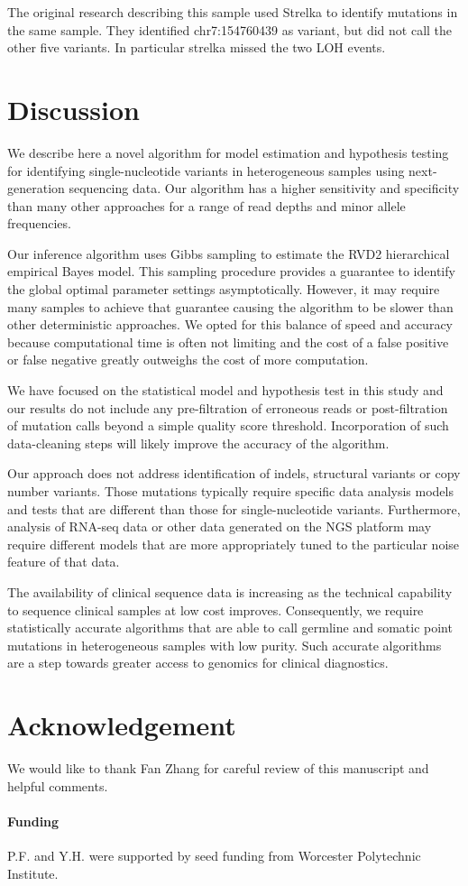 \documentclass{bioinfo}
\begin{document}
The original research describing this sample used Strelka to identify mutations in the same sample. They identified chr7:154760439 as variant, but did not call the other five variants. In particular strelka missed the two LOH events.  %

\section{Discussion}
We describe here a novel algorithm for model estimation and hypothesis testing for identifying single-nucleotide variants in heterogeneous samples using next-generation sequencing data. Our algorithm has a higher sensitivity and specificity than many other approaches for a range of read depths and minor allele frequencies.

Our inference algorithm uses Gibbs sampling to estimate the RVD2 hierarchical empirical Bayes model. This sampling procedure provides a guarantee to identify the global optimal parameter settings asymptotically. However, it may require many samples to achieve that guarantee causing the algorithm to be slower than other deterministic approaches. We opted for this balance of speed and accuracy because computational time is often not limiting and the cost of a false positive or false negative greatly outweighs the cost of more computation.

We have focused on the statistical model and hypothesis test in this study and our results do not include any pre-filtration of erroneous reads or post-filtration of mutation calls beyond a simple quality score threshold. Incorporation of such data-cleaning steps will likely improve the accuracy of the algorithm.

Our approach does not address identification of indels, structural variants or copy number variants. Those mutations typically require specific data analysis models and tests that are different than those for single-nucleotide variants. Furthermore, analysis of RNA-seq data or other data generated on the NGS platform may require different models that are more appropriately tuned to the particular noise feature of that data.

The availability of clinical sequence data is increasing as the technical capability to sequence clinical samples at low cost improves. Consequently, we require statistically accurate algorithms that are able to call germline and somatic point mutations in heterogeneous samples with low purity. Such accurate algorithms are a step towards greater access to genomics for clinical diagnostics.

\section*{Acknowledgement}
We would like to thank Fan Zhang for careful review of this manuscript and helpful comments.

\paragraph{Funding\textcolon}  P.F. and Y.H. were supported by seed funding from Worcester Polytechnic Institute.



\end{document}

